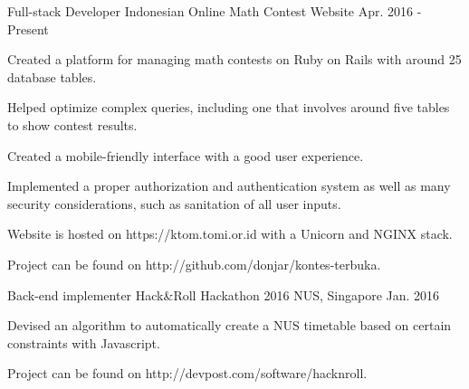 

\begin{cventries}

	\cventry
	{Full-stack Developer} %
	{Indonesian Online Math Contest Website} %
	{} %
	{Apr. 2016 - Present} %
	{
		\begin{cvitems} %
		\item {Created a platform for managing math contests on Ruby on Rails with around 25 database tables.}
		\item {Helped optimize complex queries, including one that involves around five tables to show contest results.}
		\item {Created a mobile-friendly interface with a good user experience.}
		\item {Implemented a proper authorization and authentication system as well as many security considerations, such as sanitation of all user inputs.}
		\item {Website is hosted on https://ktom.tomi.or.id with a Unicorn and NGINX stack.}
		\item {Project can be found on http://github.com/donjar/kontes-terbuka.}
		\end{cvitems}
	}

	\cventry
	{Back-end implementer} %
	{Hack\&Roll Hackathon 2016} %
	{NUS, Singapore} %
	{Jan. 2016} %
	{
		\begin{cvitems} %
		\item {Devised an algorithm to automatically create a NUS timetable based on certain constraints with Javascript.}
		\item {Project can be found on http://devpost.com/software/hacknroll.}
		\end{cvitems}
	}


\end{cventries}
